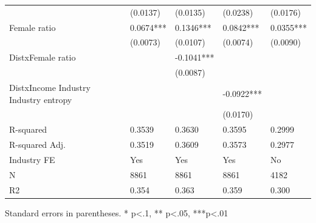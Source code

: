 \begin{table}
\begin{center}
\begin{tabular}{lllll}
                                         & (0.0137)   & (0.0135)        & (0.0238)        & (0.0176)        \\
Female ratio                    & 0.0674***  & 0.1346***       & 0.0842***       & 0.0355***       \\
                                         & (0.0073)   & (0.0107)        & (0.0074)        & (0.0090)        \\
DistxFemale ratio &            & -0.1041***      &                 &                 \\
                                         &            & (0.0087)        &                 &                 \\
DistxIncome Industry Industry entropy    &            &                 & -0.0922***      &                 \\
                                         &            &                 & (0.0170)        &                 \\
R-squared                                & 0.3539     & 0.3630          & 0.3595          & 0.2999          \\
R-squared Adj.                           & 0.3519     & 0.3609          & 0.3573          & 0.2977          \\
Industry FE                              & Yes        & Yes             & Yes             & No              \\
N                                        & 8861       & 8861            & 8861            & 4182            \\
R2                                       & 0.354      & 0.363           & 0.359           & 0.300           \\
\hline
\end{tabular}
\end{center}
\end{table}
\bigskip
Standard errors in parentheses. \newline 
* p<.1, ** p<.05, ***p<.01